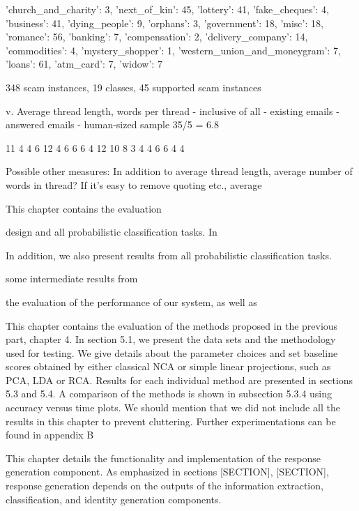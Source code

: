 {'church_and_charity': 3, 'next_of_kin': 45, 'lottery': 41, 'fake_cheques': 4, 'business': 41, 'dying_people': 9, 'orphans': 3, 'government': 18, 'misc': 18, 'romance': 56, 'banking': 7, 'compensation': 2, 'delivery_company': 14, 'commodities': 4, 'mystery_shopper': 1, 'western_union_and_moneygram': 7, 'loans': 61, 'atm_card': 7, 'widow': 7}

348 scam instances, 19 classes, 45 supported scam instances



		v.  Average thread length, words per thread
			- inclusive of all
			- existing emails
			- answered emails
			- human-sized sample 35/5 = 6.8

11
4
4
6
12
4
6
6
6
4
12
10
8
3
4
4
6
6
4
4



Possible other measures: In addition to average thread length, average number of words in thread? If it's easy to remove quoting etc., average %






This chapter contains the evaluation 



design and all probabilistic classification tasks. In 

In addition, we also present results from all probabilistic classification tasks.

some intermediate results from 

the evaluation of the performance of our system, as well as 


This chapter contains the evaluation of the methods proposed in the previous
part, chapter 4. In section 5.1, we present the data sets and the methodology
used for testing. We give details about the parameter choices and set baseline
scores obtained by either classical NCA or simple linear projections, such as PCA,
LDA or RCA. Results for each individual method are presented in sections 5.3
and 5.4. A comparison of the methods is shown in subsection 5.3.4 using accuracy
versus time plots.
We should mention that we did not include all the results in this chapter to
prevent cluttering. Further experimentations can be found in appendix B

This chapter details the functionality and implementation of the response generation component. As emphasized in sections [SECTION], [SECTION], response generation depends on the outputs of the information extraction, classification, and identity generation components. 

